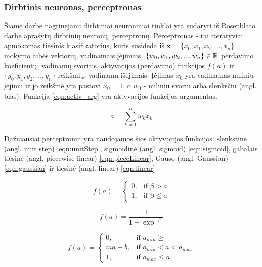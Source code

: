 \subsubsection{Dirbtinis neuronas, perceptronas}

Šiame darbe nagrinėjami dirbtiniai neuroniniai tinklai yra sudaryti iš Rosenblato darbe \cite{rosenPerc} aprašytų dirbtinių neuronų, perceptronų. Perceptronas -  tai iteratyviai apmokomas tiesinis klasifikatorius, kuris susideda iš $\boldsymbol{x} = \{x_{0}, x_{1}, x_{2}, ..., x_{n}\}$ mokymo aibės vektorių, vadinamais įėjimais, $\{w_{0}, w_{1}, w_{2}, ..., w_{n}\} \in \mathbb{R}$ perdavimo koeficientų, vadinamų svoriais, aktyvacijos (perdavimo) funkcijos $f(a)$ ir $\{y_{0}, y_{1}, y_{2}, ..., y_{n}\}$ reikšmių, vadinamų išėjimais. Įėjimas $x_{0}$ yra vadinamas nuliniu įėjimu ir jo reikšmė yra pastovi $x_{0} = 1$, o $w_{0}$ - nuliniu svoriu arba slenksčiu (angl. bias). Funkcija \ref{eqn:activ_arg} yra aktyvacijos funkcijos argumentas.

\begin{equation}
	\label{eqn:activ_arg}
	a = \sum_{k = 1}^{n} w_{k}x_k
\end{equation}

Dažniausiai perceptronui yra naudojamos šios aktyvacijos funkcijos: slenkstinė (angl. unit step) \ref{eqn:unitStep}, sigmoidinė (angl. sigmoid) \ref{eqn:sigmoid}, gabalais tiesinė (angl. piecewise linear) \ref{eqn:pieceLinear}, Gauso (angl. Gaussian) \ref{eqn:gaussian} ir tiesinė (angl. linear) \ref{eqn:linear}

\begin{equation}
	\label{eqn:unitStep}
	f(a) =
	\begin{cases}
		0, & \mbox{if } \beta > a \\
		1, & \mbox{if } \beta \leq a
	\end{cases}
\end{equation}

\begin{equation}
	\label{eqn:sigmoid}
	f(a) = \dfrac{1}{1 + \exp^{-\beta }}
\end{equation}

\begin{equation}
	\label{eqn:pieceLinear}
	f(a) =
	\begin{cases}
		0, & \mbox{if } a_{min} \geq  \\
		ma + b, & \mbox{if } a_{min} < a < a_{max} \\
		1, & \mbox{if } a_{max} \leq a
	\end{cases}
\end{equation}

